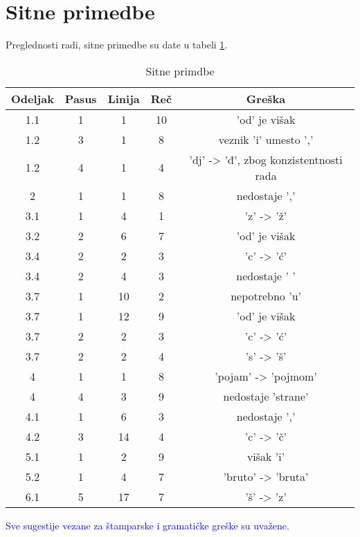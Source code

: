 \documentclass[a4paper]{report}
\newcommand{\odgovor}[1]{\textcolor{blue}{#1}}
\begin{document}
\clearpage

\section{Sitne primedbe}

Preglednosti radi, sitne primedbe su date u tabeli \ref{tab:tabela1}.

\begin{table}[h!]
\begin{center}
\caption{Sitne primdbe}
\begin{tabular}{|c|c|c|c|c|} \hline
Odeljak & Pasus & Linija & Reč & Greška\\ \hline
1.1 & 1 & 1 & 10 & 'od' je višak\\ \hline
1.2 & 3 & 1 & 8 & veznik 'i' umesto ','\\ \hline
1.2 & 4 & 1 & 4 & 'dj' -> 'đ', zbog konzistentnosti rada\\ \hline
2 & 1 & 1 & 8 & nedostaje ','\\ \hline
3.1 & 1 & 4 & 1 & 'z' -> 'ž'\\ \hline
3.2 & 2 & 6 & 7 & 'od' je višak\\ \hline
3.4 & 2 & 2 & 3 & 'c' -> 'ć'\\ \hline
3.4 & 2 & 4 & 3 & nedostaje ' '\\ \hline
3.7 & 1 & 10 & 2 & nepotrebno 'u'\\ \hline
3.7 & 1 & 12 & 9 & 'od' je višak\\ \hline
3.7 & 2 & 2 & 3 & 'c' -> 'ć'\\ \hline
3.7 & 2 & 2 & 4 & 's' -> 'š'\\ \hline
4 & 1 & 1 & 8 & 'pojam' -> 'pojmom'\\ \hline
4 & 4 & 3 & 9 & nedostaje 'strane'\\ \hline
4.1 & 1 & 6 & 3 & nedostaje ','\\ \hline
4.2 & 3 & 14 & 4 & 'c' -> 'č'\\ \hline
5.1 & 1 & 2 & 9 & višak 'i' \\ \hline
5.2 & 1 & 4 & 7 & 'bruto' -> 'bruta' \\ \hline
6.1 & 5 & 17 & 7 & 'š' -> 'z'\\ \hline

\end{tabular}
\label{tab:tabela1}
\end{center}
\end{table}

\odgovor{
	Sve sugestije vezane za štamparske i gramatičke greške su uvažene.
}
\end{document}
